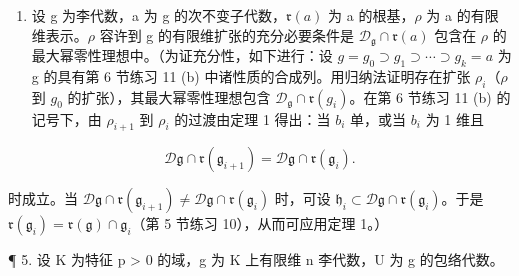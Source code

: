 \begin{enumerate}
\def\labelenumi{\arabic{enumi}.}
\setcounter{enumi}{3}
\tightlist
\item
  设 g 为李代数，a 为 g 的次不变子代数，\(\mathfrak{r}(a)\) 为 a 的根基，\(\rho\) 为 a 的有限维表示。\(\rho\) 容许到 g 的有限维扩张的充分必要条件是 \(\mathcal{D}_{\mathfrak{g}} \cap \mathfrak{r}(a)\) 包含在 \(\rho\) 的最大幂零性理想中。（为证充分性，如下进行：设 \(g = g_{0} \supset g_{1} \supset \cdots \supset g_{k} = a\) 为 g 的具有第 6 节练习 11 (b) 中诸性质的合成列。用归纳法证明存在扩张 \(\rho_{i}\)（\(\rho\) 到 \(g_{0}\) 的扩张），其最大幂零性理想包含 \(\mathcal{D}_{\mathfrak{g}} \cap \mathfrak{r}(g_{i})\)。在第 6 节练习 11 (b) 的记号下，由 \(\rho_{i+1}\) 到 \(\rho_{i}\) 的过渡由定理 1 得出：当 \(b_{i}\) 单，或当 \(b_{i}\) 为 1 维且
\end{enumerate}

\[
\mathscr {D} \mathfrak {g} \cap \mathfrak {r} (\mathfrak {g} _ {i + 1}) = \mathscr {D} \mathfrak {g} \cap \mathfrak {r} (\mathfrak {g} _ {i}).
\]

时成立。当 \(\mathcal{D}\mathfrak{g} \cap \mathfrak{r}(\mathfrak{g}_{i+1}) \neq \mathcal{D}\mathfrak{g} \cap \mathfrak{r}(\mathfrak{g}_i)\) 时，可设 \(\mathfrak{h}_i \subset \mathcal{D}\mathfrak{g} \cap \mathfrak{r}(\mathfrak{g}_i)\)。于是 \(\mathfrak{r}(\mathfrak{g}_i) = \mathfrak{r}(\mathfrak{g}) \cap \mathfrak{g}_i\)（第 5 节练习 10），从而可应用定理 1。）

¶ 5. 设 K 为特征 p \textgreater{} 0 的域，g 为 K 上有限维 n 李代数，U 为 g 的包络代数。


